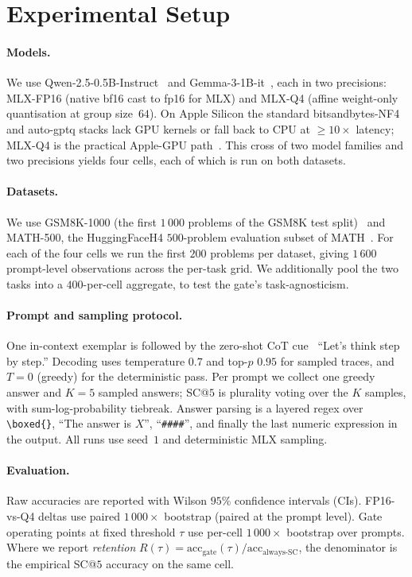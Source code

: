 \documentclass[11pt]{article}
\begin{document}
\section{Experimental Setup}
\label{sec:setup}

\paragraph{Models.}
We use Qwen-2.5-0.5B-Instruct~\citep{Qwen25Report} and
Gemma-3-1B-it~\citep{Gemma3Report}, each in two precisions:
MLX-FP16 (native bf16 cast to fp16 for MLX) and MLX-Q4 (affine
weight-only quantisation at group size~$64$). On Apple Silicon the
standard bitsandbytes-NF4 and auto-gptq stacks lack GPU kernels or
fall back to CPU at $\ge 10\times$ latency; MLX-Q4 is the practical
Apple-GPU path~\citep{MLX2024}. This cross of two model families
and two precisions yields four cells, each of which is run on both
datasets.

\paragraph{Datasets.}
We use GSM8K-1000 (the first $1\,000$ problems of the GSM8K test
split)~\citep{Cobbe2021Verifiers} and MATH-500, the HuggingFaceH4
$500$-problem evaluation subset of MATH~\citep{Hendrycks2021MATH,
Lightman2023LetsVerify}. For each of the four cells we run the
first $200$ problems per dataset, giving $1\,600$ prompt-level
observations across the per-task grid. We additionally pool the
two tasks into a $400$-per-cell aggregate, to test the gate's
task-agnosticism.

\paragraph{Prompt and sampling protocol.}
One in-context exemplar is followed by the zero-shot CoT
cue~\citep{Kojima2022ZeroShotCoT} ``Let's think step by step.''
Decoding uses temperature $0.7$ and top-$p$ $0.95$ for sampled
traces, and $T{=}0$ (greedy) for the deterministic pass. Per prompt
we collect one greedy answer and $K{=}5$ sampled answers; SC@$5$ is
plurality voting over the $K$ samples, with sum-log-probability
tiebreak. Answer parsing is a layered regex over \verb|\boxed{}|,
``The answer is $X$'', ``\verb|####|'', and finally the last numeric
expression in the output. All runs use seed~$1$ and deterministic
MLX sampling.

\paragraph{Evaluation.}
Raw accuracies are reported with Wilson $95\%$ confidence intervals
(CIs). FP16-vs-Q4 deltas use paired $1\,000{\times}$ bootstrap
(paired at the prompt level). Gate operating points at fixed
threshold $\tau$ use per-cell $1\,000{\times}$ bootstrap over prompts. Where we report
\emph{retention} $R(\tau) = \text{acc}_\text{gate}(\tau) /
\text{acc}_\text{always-SC}$, the denominator is the empirical SC@$5$
accuracy on the same cell.
\end{document}
